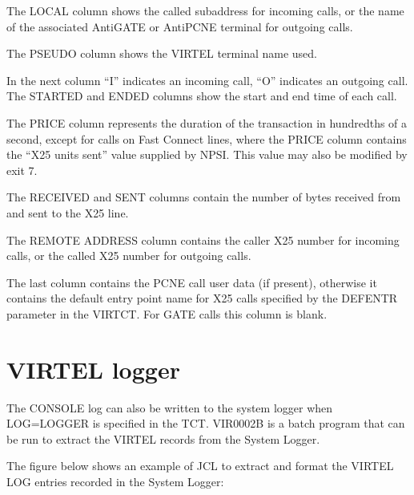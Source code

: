 \documentclass[letterpaper,10pt,english]{sphinxmanual}
\begin{document}
\sphinxAtStartPar
The LOCAL column shows the called subaddress for incoming calls, or the name of the associated AntiGATE or AntiPCNE terminal for outgoing calls.

\sphinxAtStartPar
The PSEUDO column shows the VIRTEL terminal name used.

\sphinxAtStartPar
In the next column “I” indicates an incoming call, “O” indicates an outgoing call. The STARTED and ENDED columns show the start and end time of each call.

\sphinxAtStartPar
The PRICE column represents the duration of the transaction in hundredths of a second, except for calls on Fast Connect lines, where the PRICE column contains the “X25 units sent” value supplied by NPSI. This value may also be modified by exit 7.

\sphinxAtStartPar
The RECEIVED and SENT columns contain the number of bytes received from and sent to the X25 line.

\sphinxAtStartPar
The REMOTE ADDRESS column contains the caller X25 number for incoming calls, or the called X25 number for outgoing calls.

\sphinxAtStartPar
The last column contains the PCNE call user data (if present), otherwise it contains the default entry point name for X25 calls specified by the DEFENTR parameter in the VIRTCT. For GATE calls this column is blank.

\newpage

\ignorespaces 

\section{VIRTEL logger}
\label{\detokenize{audit_operations_ and_performance:virtel-logger}}\label{\detokenize{audit_operations_ and_performance:index-76}}
\sphinxAtStartPar
The CONSOLE log can also be written to the system logger when LOG=LOGGER is specified in the TCT. VIR0002B is a batch program that can be run to extract the VIRTEL records from the System Logger.

\sphinxAtStartPar
The figure below shows an example of JCL to extract and format the VIRTEL LOG entries recorded in the System Logger:
\end{document}
